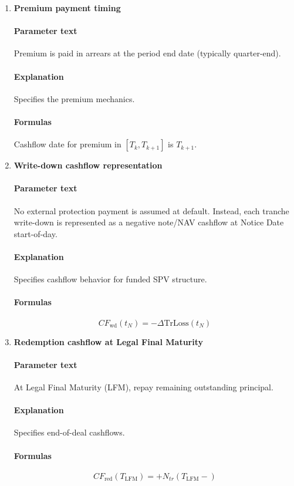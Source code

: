 \documentclass[11pt]{article}
\begin{document}
\begin{enumerate}[label=\arabic*),leftmargin=*,align=left]
\item \textbf{Premium payment timing}
\paragraph{Parameter text} Premium is paid in arrears at the period end date (typically quarter-end). 
\paragraph{Explanation} Specifies the premium mechanics.
\paragraph{Formulas} Cashflow date for premium in $[T_k, T_{k+1}]$ is $T_{k+1}$.

\item \textbf{Write-down cashflow representation}
\paragraph{Parameter text} No external protection payment is assumed at default. Instead, each tranche write-down is represented as a negative note/NAV cashflow at Notice Date start-of-day.
\paragraph{Explanation} Specifies cashflow behavior for funded SPV structure.
\paragraph{Formulas}
\[ CF_{\text{wd}}(t_N) = -\Delta \text{TrLoss}(t_N) \]

\item \textbf{Redemption cashflow at Legal Final Maturity}
\paragraph{Parameter text} At Legal Final Maturity (LFM), repay remaining outstanding principal.
\paragraph{Explanation} Specifies end-of-deal cashflows.
\paragraph{Formulas}
\[ CF_{\text{red}}(T_{\text{LFM}}) = +N_{tr}(T_{\text{LFM}}-) \]


\end{enumerate}
\end{document}
